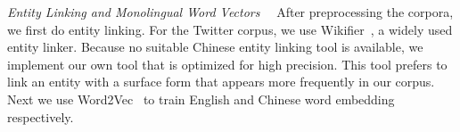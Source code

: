\textit{Entity Linking and Monolingual Word Vectors}~~
After preprocessing the corpora, we first do entity linking.
For the Twitter corpus, we use Wikifier~\cite{cheng2013relational,ratinov2011local}, a widely used
entity linker. 
Because no suitable Chinese entity linking tool is available, 
we implement our own tool that is optimized for high precision. 
This tool prefers to link an entity with a surface form that appears
more frequently in our corpus. 
%
%
Next we use Word2Vec~\cite{Mikolov2013distributed} to train English and Chinese word embedding respectively.

